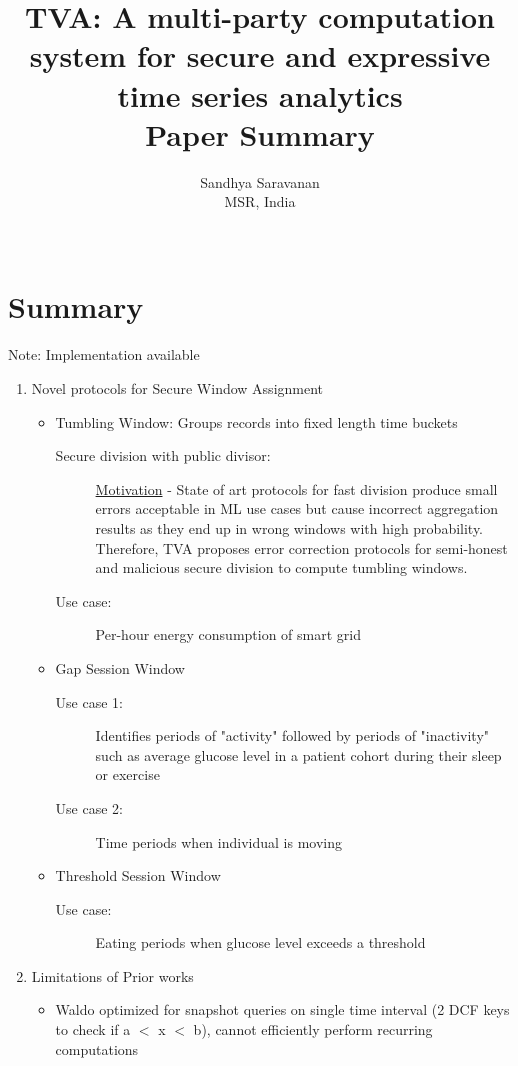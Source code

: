 \documentclass{article}
\title{TVA: A multi-party computation system for secure and expressive time series analytics \large \\Paper Summary}
\author{Sandhya Saravanan\\
  \small MSR, India\\\\
}
\date{\vspace{-5ex}}
\begin{document}
\maketitle

\section{Summary}
Note: Implementation available
\begin{enumerate}
   \item Novel protocols for Secure Window Assignment
   \begin{itemize}
     \item Tumbling Window: Groups records into fixed length time buckets
     \begin{description}
     \item[Secure division with public divisor:] \underline{Motivation} - State of art protocols for fast division produce small errors acceptable in ML use cases but cause incorrect aggregation results as they end up in wrong windows with high probability. Therefore, TVA proposes error correction protocols for semi-honest and malicious secure division to compute tumbling windows. 
     \item[Use case:] Per-hour energy consumption of smart grid
     \end{description}
     \item Gap Session Window 
    \begin{description}
     \item[Use case 1:] Identifies periods of "activity" followed by periods of "inactivity" such as average glucose level in a patient cohort during their sleep or exercise
     \item[Use case 2:] Time periods when individual is moving
     \end{description} 
     \item Threshold Session Window
     \begin{description}
     \item[Use case:] Eating periods when glucose level exceeds a threshold 
     \end{description}
   \end{itemize}
    \item Limitations of Prior works
    \begin{itemize}
       \item Waldo optimized for snapshot queries on single time interval (2 DCF keys to check if a $<$ x $<$ b), cannot efficiently perform recurring computations

\end{itemize}
\end{enumerate}
\end{document}
